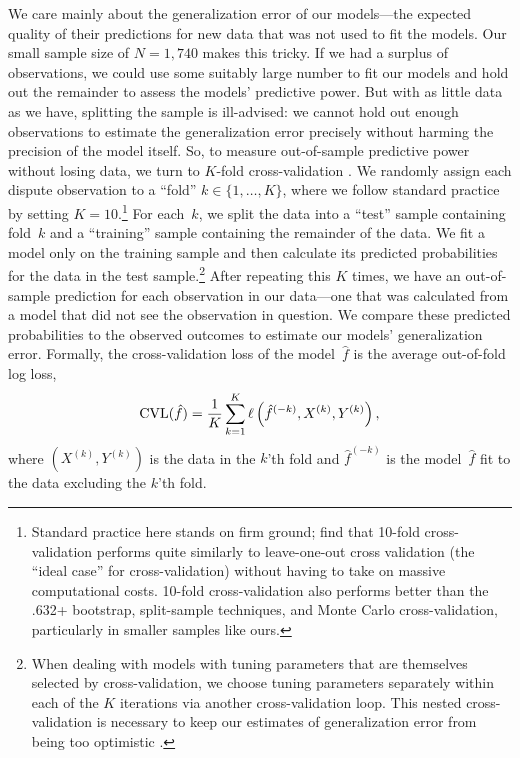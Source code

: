 We care mainly about the generalization error of our models---the expected quality of their predictions for new data that was not used to fit the models.
Our small sample size of $N = 1{,}740$ makes this tricky.
If we had a surplus of observations, we could use some suitably large number to fit our models and hold out the remainder to assess the models' predictive power.
But with as little data as we have, splitting the sample is ill-advised: we cannot hold out enough observations to estimate the generalization error precisely without harming the precision of the model itself.
So, to measure out-of-sample predictive power without losing data, we turn to $K$-fold cross-validation \citep[241--249]{Hastie:2009wpa}.
We randomly assign each dispute observation to a ``fold'' $k \in \{1, \ldots, K\}$, where we follow standard practice by setting $K = 10$.\footnote{Standard practice here stands on firm ground; \citet{molinaro2005} find that 10-fold cross-validation performs quite similarly to leave-one-out cross validation (the ``ideal case'' for cross-validation) without having to take on massive computational costs.  10-fold cross-validation also performs better than the .632+ bootstrap, split-sample techniques, and Monte Carlo cross-validation, particularly in smaller samples like ours.}
For each~$k$, we split the data into a ``test'' sample containing fold~$k$ and a ``training'' sample containing the remainder of the data.
We fit a model only on the training sample and then calculate its predicted probabilities for the data in the test sample.\footnote{
  \label{fn:nested-cv}
  When dealing with models with tuning parameters that are themselves selected by cross-validation, we choose tuning parameters separately within each of the $K$ iterations via another cross-validation loop.
  This nested cross-validation is necessary to keep our estimates of generalization error from being too optimistic \citep{Varma:2006ch}.
}
After repeating this $K$ times, we have an out-of-sample prediction for each observation in our data---one that was calculated from a model that did not see the observation in question.
We compare these predicted probabilities to the observed outcomes to estimate our models' generalization error.
Formally, the cross-validation loss of the model~$\hat{f}$ is the average out-of-fold log loss,
\begin{equation}
  \label{eq:cv-loss}
  \operatorname{CVL}(\hat{f})
  =
  \frac{1}{K} \sum_{k=1}^K \ell \left(
    \hat{f}^{(-k)}, X^{(k)}, Y^{(k)}
  \right),
\end{equation}
where $(X^{(k)}, Y^{(k)})$ is the data in the $k$'th fold and $\hat{f}^{(-k)}$ is the model~$\hat{f}$ fit to the data excluding the $k$'th fold.

